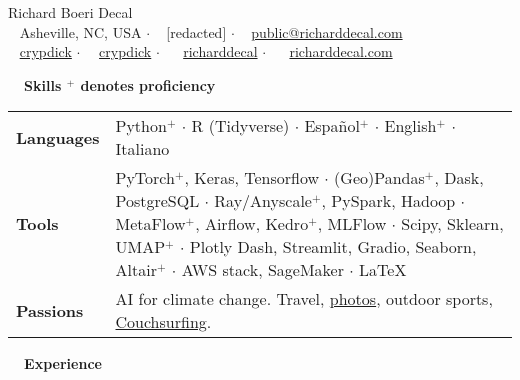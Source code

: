 \documentclass[a4paper,12pt]{article}
\newcommand{\resheading}[1]{{\vspace*{.001in} \colorbox{mygrey}{\begin{minipage}{\textwidth}{\textmd{\large \textbf{#1} \vphantom{p\^{E}}}}\end{minipage}}} }
\newcommand{\ressubheading}[4]{
    \textbf{#1} \hfill #2\\
    \textit{#3} \hfill #4 \\}
\begin{document}
    \begin{center}
    {\Huge Richard Boeri Decal}
        \\
        {\small \faMapMarker~ Asheville, NC, USA $\cdot$ \faPhone~ [redacted] $\cdot$ \faEnvelope~ \href{mailto:public@richarddecal.com}{public@richarddecal.com}  \\ \faGithubAlt~ \href{https://github.com/crypdick}{crypdick} $\cdot$~\faStackOverflow~  \href{https://stackoverflow.com/users/4212158/crypdick}{crypdick} $\cdot$ ~\faLinkedin~ \href{https://www.linkedin.com/in/richarddecal/}{richarddecal} $\cdot$ ~\faHome~  \href{http://www.richarddecal.com}{richarddecal.com}}
    \end{center}

    \resheading{~~Skills \hfill {\small$^+$ denotes proficiency}}
    \vspace{-1em}
    \begin{tabularx}{\textwidth}{p{2.1cm}>{\arraybackslash}X}
        \bfseries{Languages} & Python$^+$ $\cdot$ R (Tidyverse) $\cdot$ Espa\~nol$^+$ $\cdot$ English$^+$ $\cdot$ Italiano                                                                                                                                                                                                   \\
        \bfseries{Tools}     & PyTorch$^+$, Keras, Tensorflow  $\cdot$ (Geo)Pandas$^+$, Dask, PostgreSQL $\cdot$ Ray/Anyscale$^+$, PySpark, Hadoop $\cdot$ MetaFlow$^+$, Airflow, Kedro$^+$, MLFlow $\cdot$ Scipy, Sklearn, UMAP$^+$ $\cdot$ Plotly Dash, Streamlit, Gradio, Seaborn, Altair$^+$  $\cdot$ AWS stack, SageMaker $\cdot$  \LaTeX \\
        \bfseries{Passions}  & AI for climate change. Travel, \href{https://www.flickr.com/photos/richarddecal/sets/72157640025469005/}{photos}, outdoor sports, \href{https://www.couchsurfing.com/people/rovingrichard/references}{Couchsurfing}.
    \end{tabularx}


    \resheading{~~Experience}
    \vspace{-1em}
\end{document}
